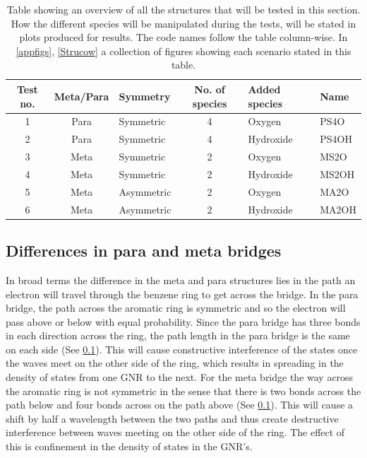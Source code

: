 \begin{table}[ht]
\begin{tabular}{cclcll}
		\toprule
		Test no. & Meta/Para & Symmetry   & No. of species & Added species & Name  \\ \midrule
		1        & Para      & Symmetric  & 4              & Oxygen        & PS4O  \\
		2        & Para      & Symmetric  & 4              & Hydroxide     & PS4OH \\
		3        & Meta      & Symmetric  & 2              & Oxygen        & MS2O  \\
		4        & Meta      & Symmetric  & 2              & Hydroxide     & MS2OH \\
		5        & Meta      & Asymmetric & 2              & Oxygen        & MA2O  \\
		6        & Meta      & Asymmetric & 2              & Hydroxide     & MA2OH \\
		\bottomrule
	\end{tabular}
	\caption{Table showing an overview of all the structures that will be tested in this section.  How the different species will be manipulated during the tests, will be stated in plots produced for results. The code names follow the table column-wise. In \cref{appfigs}, \cref{Strucow} a collection of figures showing each scenario stated in this table.}
\label{testtable}
\end{table}
\subsection{Differences in para and meta bridges}
In broad terms the difference in the meta and para structures lies in the path an electron will travel through the benzene ring to get across the bridge. In the para bridge, the path across the aromatic ring is symmetric and so the electron will pass above or below with equal probability. Since the para bridge has three bonds in each direction across the ring, the path length in the para bridge is the same on each side (See \cref{}). This will cause constructive interference of the states once the waves meet on the other side of the ring, which results in spreading in the density of states from one GNR to the next. For the meta bridge the way across the aromatic ring is not symmetric in the sense that there is two bonds across the path below and four bonds across on the path above (See \cref{}). This will cause a shift by half a wavelength between the two paths and thus create destructive interference between waves meeting on the other side of the ring. The effect of this is confinement in the density of states in the GNR's. 
